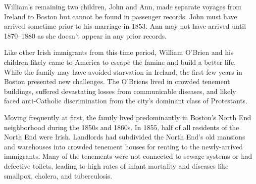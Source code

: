 William's remaining two children, John and Ann, made separate voyages from Ireland to Boston but cannot be found in passenger records. John must have arrived sometime prior to his marriage in 1853.\cite{John2OBrienCivilMarriage:1} Ann may not have arrived until 1870--1880 as she doesn't appear in any prior records.\cite{Census1880Edward:1} 

Like other Irish immigrants from this time period, William O'Brien and his children likely came to America to escape the famine and build a better life. While the family may have avoided starvation in Ireland, the first few years in Boston presented new challenges. The O'Briens lived in crowded tenement buildings, suffered devastating losses from communicable diseases, and likely faced anti-Catholic discrimination from the city's dominant class of Protestants.\cite{Protestantism}
	
Moving frequently at first, the family lived predominantly in Boston's North End neighborhood during the 1850s and 1860s.\cite{NorthEndAddresses} In 1855, half of all residents of the North End were Irish.\cite{Todisco:29} Landlords had subdivided the North End's old mansions and warehouses into crowded tenement houses for renting to the newly-arrived immigrants.\cite{Goldfeld:102} Many of the tenements were not connected to sewage systems or had defective toilets, leading to high rates of infant mortality and diseases like smallpox, cholera, and tuberculosis.\cite{tuberculosis}

